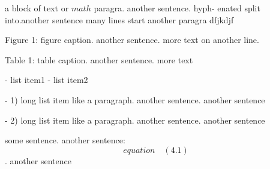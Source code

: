 a block of text or $math$ paragra. another sentence. hyph-
enated split into.another sentence
many lines
    start another paragra
dfjkdjf

Figure 1: figure caption. another sentence.
more text on another line.

Table 1: table caption. another sentence.
more text

- list item1
- list item2

- 1) long list item like a paragraph. another sentence. another sentence

- 2) long list item like a paragraph. another sentence. another sentence

some sentence. another sentence:
$$equation \quad (4.1)$$.
another sentence

